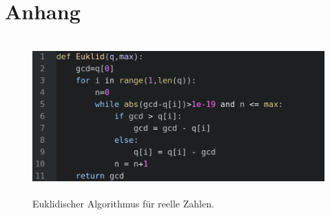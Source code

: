 
\section{Anhang}
\begin{figure}
  \centering
  \includegraphics[height=6cm]{ressources/kot.png}
  \caption{Euklidischer Algorithmus für reelle Zahlen.}
  \label{kot}
\end{figure}

% 
% 
%
